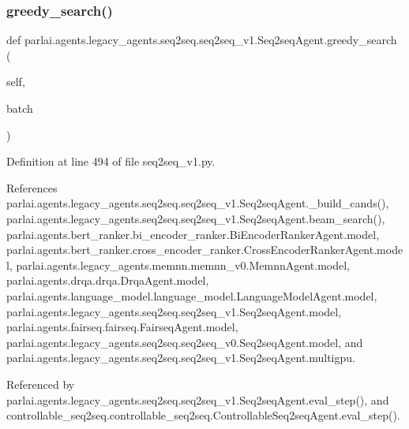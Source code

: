 \subsubsection{\texorpdfstring{greedy\+\_\+search()}{greedy\_search()}}
{\footnotesize\ttfamily def parlai.\+agents.\+legacy\+\_\+agents.\+seq2seq.\+seq2seq\+\_\+v1.\+Seq2seq\+Agent.\+greedy\+\_\+search (\begin{DoxyParamCaption}\item[{}]{self,  }\item[{}]{batch }\end{DoxyParamCaption})}



Definition at line 494 of file seq2seq\+\_\+v1.\+py.



References parlai.\+agents.\+legacy\+\_\+agents.\+seq2seq.\+seq2seq\+\_\+v1.\+Seq2seq\+Agent.\+\_\+build\+\_\+cands(), parlai.\+agents.\+legacy\+\_\+agents.\+seq2seq.\+seq2seq\+\_\+v1.\+Seq2seq\+Agent.\+beam\+\_\+search(), parlai.\+agents.\+bert\+\_\+ranker.\+bi\+\_\+encoder\+\_\+ranker.\+Bi\+Encoder\+Ranker\+Agent.\+model, parlai.\+agents.\+bert\+\_\+ranker.\+cross\+\_\+encoder\+\_\+ranker.\+Cross\+Encoder\+Ranker\+Agent.\+model, parlai.\+agents.\+legacy\+\_\+agents.\+memnn.\+memnn\+\_\+v0.\+Memnn\+Agent.\+model, parlai.\+agents.\+drqa.\+drqa.\+Drqa\+Agent.\+model, parlai.\+agents.\+language\+\_\+model.\+language\+\_\+model.\+Language\+Model\+Agent.\+model, parlai.\+agents.\+legacy\+\_\+agents.\+seq2seq.\+seq2seq\+\_\+v1.\+Seq2seq\+Agent.\+model, parlai.\+agents.\+fairseq.\+fairseq.\+Fairseq\+Agent.\+model, parlai.\+agents.\+legacy\+\_\+agents.\+seq2seq.\+seq2seq\+\_\+v0.\+Seq2seq\+Agent.\+model, and parlai.\+agents.\+legacy\+\_\+agents.\+seq2seq.\+seq2seq\+\_\+v1.\+Seq2seq\+Agent.\+multigpu.



Referenced by parlai.\+agents.\+legacy\+\_\+agents.\+seq2seq.\+seq2seq\+\_\+v1.\+Seq2seq\+Agent.\+eval\+\_\+step(), and controllable\+\_\+seq2seq.\+controllable\+\_\+seq2seq.\+Controllable\+Seq2seq\+Agent.\+eval\+\_\+step().

